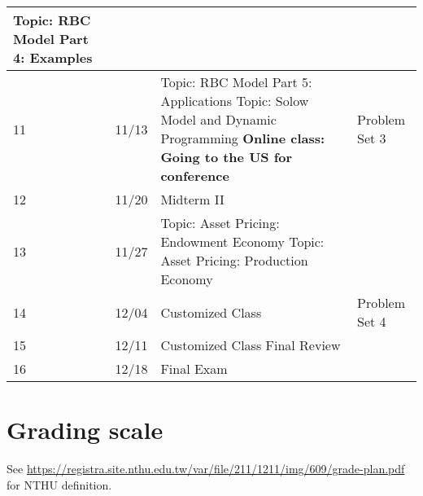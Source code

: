 \documentclass[12pt]{article}
\begin{document}
\begin{tabular}{|p{\bb}|p{\bb}|p{\pp}|p{\rr}|}
        \newline
        Topic: RBC Model Part 4: Examples
        &
    \\
    \hline
        11
        &
        11/13
        &
        Topic: RBC Model Part 5: Applications
        \newline
        Topic: Solow Model and Dynamic Programming
        \newline
        \textbf{Online class: Going to the US for conference}
        &
        Problem Set 3
    \\
    \hline
        12
        &
        11/20
        &
        Midterm II
        &
    \\
    \hline
        13
        &
        11/27
        &
        Topic: Asset Pricing: Endowment Economy
        \newline
        Topic: Asset Pricing: Production Economy
        &
    \\
    \hline
        14
        &
        12/04
        &
        Customized Class
        &
        Problem Set 4
    \\
    \hline
        15
        &
        12/11
        &
        Customized Class
        \newline
        Final Review
        &
    \\
    \hline
        16
        &
        12/18
        &
        Final Exam
        &
    \\
    \hline
\end{tabular}

\section*{Grading scale}

See \url{https://registra.site.nthu.edu.tw/var/file/211/1211/img/609/grade-plan.pdf} for NTHU definition.
\end{document}
